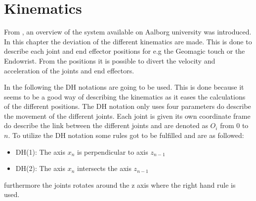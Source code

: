 \chapter{Kinematics}\label{cha:kinematic}

From , an overview of the system available on Aalborg university was introduced. In this chapter the deviation of the different kinematics are made. This is done to describe each joint and end effector positions for e.g the Geomagic touch or the Endowrist. From the positions it is possible to divert the velocity and acceleration of the joints and end effectors.

In the following the \gls{DH} notations are going to be used. This is done because it seems to be a good way of describing the kinematics as it eases the calculations of the different positions. The \gls{DH} notation only uses four parameters do describe the movement of the different joints. Each joint is given its own coordinate frame do describe the link between the different joints and are denoted as $O_i$ from 0 to $n$. To utilize the \gls{DH} notation some rules got to be fulfilled and are as followed:

\begin{itemize}
\item DH(1): The axis $x_n$ is perpendicular to axis $z_{n-1}$
\item DH(2): The axis $x_n$ intersects the axis $z_{n-1}$
\end{itemize}

furthermore the joints rotates around the z axis where the right hand rule is used.




